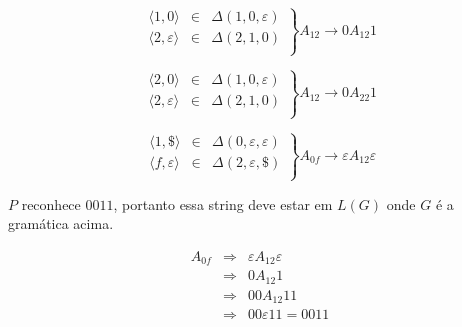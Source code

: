 \begin{example}
    \begin{center}
  \end{center}  

\begin{displaymath}
  \left.\begin{array}{ccc}
    \langle 1, 0 \rangle & \in & \Delta(1, 0, \varepsilon)\\
    \langle 2, \varepsilon \rangle & \in & \Delta(2, 1, 0)\\
  \end{array}\right\} A_{12} \to 0 A_{12} 1
\end{displaymath}

\begin{displaymath}
  \left.\begin{array}{ccc}
    \langle 2, 0 \rangle & \in & \Delta(1, 0, \varepsilon)\\
    \langle 2, \varepsilon \rangle & \in & \Delta(2, 1, 0)\\
  \end{array}\right\} A_{12} \to 0 A_{22} 1
\end{displaymath}

\begin{displaymath}
  \left.\begin{array}{ccc}
      \langle 1, \$ \rangle & \in & \Delta(0, \varepsilon, \varepsilon)\\
      \langle f, \varepsilon \rangle & \in & \Delta(2, \varepsilon, \$)\\
    \end{array}\right\} A_{0f} \to \varepsilon A_{12} \varepsilon
\end{displaymath}

$P$ reconhece $0011$, portanto essa string deve estar em $L(G)$ onde $G$ é a gramática acima.


\begin{eqnarray*}
  A_{0f} & \Rightarrow & \varepsilon A_{12} \varepsilon \\
        & \Rightarrow & 0 A_{12} 1 \\
        & \Rightarrow & 00 A_{12} 11 \\
        & \Rightarrow & 00 \varepsilon 11 = 0011
\end{eqnarray*}
\end{example}



